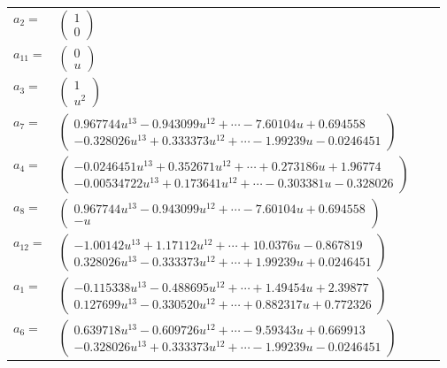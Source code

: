\documentclass[1p]{elsarticle_modified}
\theoremstyle{definition}
\begin{document}
\begin{tabular}{m{7pt} m{180pt} m{7pt} m{180pt} }
\flushright $a_{2}=$&$\begin{pmatrix}1\\0\end{pmatrix}$ \\
\flushright $a_{11}=$&$\begin{pmatrix}0\\u\end{pmatrix}$ \\
\flushright $a_{3}=$&$\begin{pmatrix}1\\u^2\end{pmatrix}$ \\
\flushright $a_{7}=$&$\begin{pmatrix}0.967744 u^{13}-0.943099 u^{12}+\cdots-7.60104 u+0.694558\\-0.328026 u^{13}+0.333373 u^{12}+\cdots-1.99239 u-0.0246451\end{pmatrix}$ \\
\flushright $a_{4}=$&$\begin{pmatrix}-0.0246451 u^{13}+0.352671 u^{12}+\cdots+0.273186 u+1.96774\\-0.00534722 u^{13}+0.173641 u^{12}+\cdots-0.303381 u-0.328026\end{pmatrix}$ \\
\flushright $a_{8}=$&$\begin{pmatrix}0.967744 u^{13}-0.943099 u^{12}+\cdots-7.60104 u+0.694558\\- u\end{pmatrix}$ \\
\flushright $a_{12}=$&$\begin{pmatrix}-1.00142 u^{13}+1.17112 u^{12}+\cdots+10.0376 u-0.867819\\0.328026 u^{13}-0.333373 u^{12}+\cdots+1.99239 u+0.0246451\end{pmatrix}$ \\
\flushright $a_{1}=$&$\begin{pmatrix}-0.115338 u^{13}-0.488695 u^{12}+\cdots+1.49454 u+2.39877\\0.127699 u^{13}-0.330520 u^{12}+\cdots+0.882317 u+0.772326\end{pmatrix}$ \\
\flushright $a_{6}=$&$\begin{pmatrix}0.639718 u^{13}-0.609726 u^{12}+\cdots-9.59343 u+0.669913\\-0.328026 u^{13}+0.333373 u^{12}+\cdots-1.99239 u-0.0246451\end{pmatrix}$ \\

\end{tabular}
\end{document}
